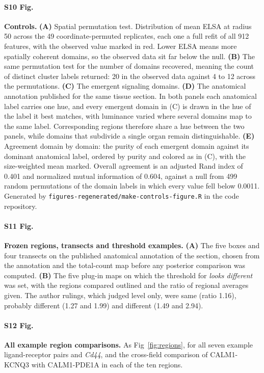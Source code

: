 \documentclass[10pt,letterpaper]{article}
\begin{document}
\paragraph*{S10 Fig.}
\label{S10_Fig}
\textbf{Controls.} \textbf{(A)} Spatial permutation test. Distribution of mean ELSA at radius
50 across the 49 coordinate-permuted replicates, each one a full refit of all 912 features,
with the observed value marked in red. Lower ELSA means more spatially coherent domains, so
the observed data sit far below the null. \textbf{(B)} The same permutation test for the
number of domains recovered, meaning the count of distinct cluster labels returned: 20 in the
observed data against 4 to 12 across the permutations. \textbf{(C)} The emergent signaling
domains. \textbf{(D)} The anatomical annotation published for the same tissue section. In both
panels each anatomical label carries one hue, and every emergent domain in (C) is drawn in the
hue of the label it best matches, with luminance varied where several domains map to the same
label. Corresponding regions therefore share a hue between the two panels, while domains that
subdivide a single organ remain distinguishable. \textbf{(E)} Agreement domain by domain: the
purity of each emergent domain against its dominant anatomical label, ordered by purity and
colored as in (C), with the size-weighted mean marked. Overall agreement is an adjusted Rand
index of 0.401 and normalized mutual information of 0.604, against a null from 499 random
permutations of the domain labels in which every value fell below 0.0011. Generated by
\texttt{figures-regenerated/make-controls-figure.R} in the code repository.

\paragraph*{S11 Fig.}
\label{S11_Fig}
\textbf{Frozen regions, transects and threshold examples.} \textbf{(A)} The five boxes and four transects on the published anatomical annotation of the section, chosen from the annotation and the total-count map before any posterior comparison was computed. \textbf{(B)} The five plug-in maps on which the threshold for \textit{looks different} was set, with the regions compared outlined and the ratio of regional averages given. The author rulings, which judged level only, were same (ratio 1.16), probably different (1.27 and 1.99) and different (1.49 and 2.94).

\paragraph*{S12 Fig.}
\label{S12_Fig}
\textbf{All example region comparisons.} As Fig~\ref{fig:regions}, for all seven example ligand-receptor pairs and \textit{Cd44}, and the cross-field comparison of CALM1-KCNQ3 with CALM1-PDE1A in each of the ten regions.
\end{document}
